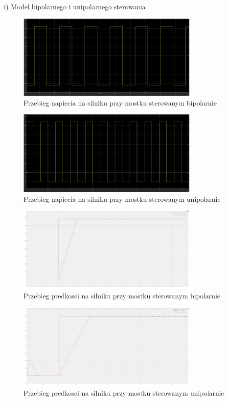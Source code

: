 \documentclass[11pt]{article}
\begin{document}
i) Model bipolarnego i unipolarnego sterowania

\begin{figure}[H]
\centering
\includegraphics[width=0.8\textwidth]{aun1_bipolar_bridge.png}
\caption{Przebieg napiecia na silniku przy mostku sterowanym bipolarnie}
\end{figure}

\begin{figure}[H]
\centering
\includegraphics[width=0.8\textwidth]{aun1_unipolar_bridge.png}
\caption{Przebieg napiecia na silniku przy mostku sterowanym unipolarnie}
\end{figure}

\begin{figure}[H]
\centering
\includegraphics[width=0.8\textwidth]{aun1_bipolar_bridge2.png}
\caption{Przebieg predkosci na silniku przy mostku sterowanym bipolarnie}
\end{figure}

\begin{figure}[H]
\centering
\includegraphics[width=0.8\textwidth]{aun1_unipolar_bridge2.png}
\caption{Przebieg predkosci na silniku przy mostku sterowanym unipolarnie}
\end{figure}
\end{document}
